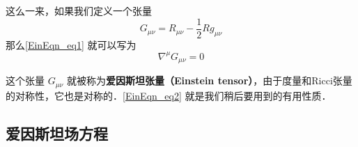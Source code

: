 

这么一来，如果我们定义一个张量
\begin{equation}
G_{\mu\nu}=R_{\mu\nu}-\frac{1}{2}Rg_{\mu\nu}
\end{equation}
那么\autoref{EinEqn_eq1} 就可以写为
\begin{equation}\label{EinEqn_eq2}
\nabla^\mu G_{\mu\nu}=0
\end{equation}

这个张量 $G_{\mu\nu}$ 就被称为\textbf{爱因斯坦张量（Einstein tensor）}，由于度量和Ricci张量的对称性，它也是对称的．\autoref{EinEqn_eq2} 就是我们稍后要用到的有用性质．









\subsection{爱因斯坦场方程}

